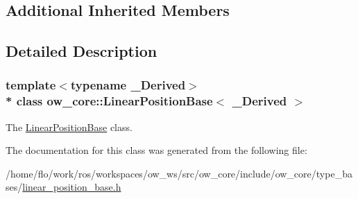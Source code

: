 \subsection*{Additional Inherited Members}


\subsection{Detailed Description}
\subsubsection*{template$<$typename \+\_\+\+Derived$>$\\*
class ow\+\_\+core\+::\+Linear\+Position\+Base$<$ \+\_\+\+Derived $>$}

The \hyperlink{classow__core_1_1LinearPositionBase}{Linear\+Position\+Base} class. 

The documentation for this class was generated from the following file\+:\begin{DoxyCompactItemize}
\item 
/home/flo/work/ros/workspaces/ow\+\_\+ws/src/ow\+\_\+core/include/ow\+\_\+core/type\+\_\+bases/\hyperlink{linear__position__base_8h}{linear\+\_\+position\+\_\+base.\+h}\end{DoxyCompactItemize}
